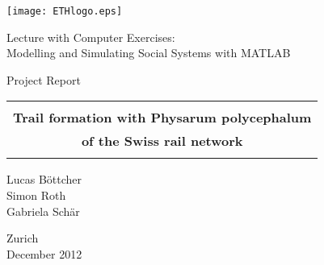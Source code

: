
\thispagestyle{empty}

\begin{center}
\texttt{[image: ETHlogo.eps]}

\bigskip


\bigskip


\bigskip


\LARGE{ 	Lecture with Computer Exercises:\\ }
\LARGE{ Modelling and Simulating Social Systems with MATLAB\\}

\bigskip

\bigskip

\small{Project Report}\\

\bigskip

\bigskip

\bigskip

\bigskip


\begin{tabular}{|c|}
\hline
\\
\textbf{\LARGE{Trail formation with Physarum polycephalum}}\\
\textbf{\LARGE{of the Swiss rail network}}\\
\\
\hline
\end{tabular}
\bigskip

\bigskip

\bigskip

\LARGE{Lucas Böttcher \\ Simon Roth \\ Gabriela Schär}



\bigskip

\bigskip

\bigskip

\bigskip

\bigskip

\bigskip

\bigskip

\bigskip

Zurich\\
December 2012\\

\end{center}


